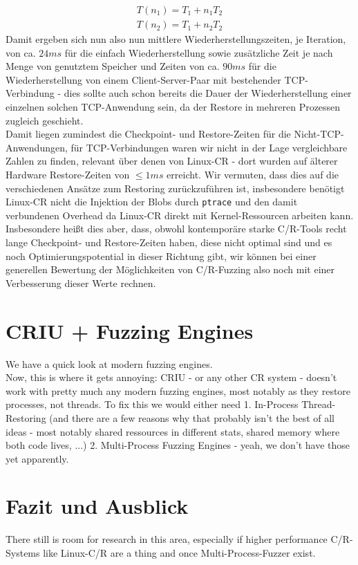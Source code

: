 \documentclass[a4paper]{article}
\begin{document}
\begin{equation}
    \begin{split}
    T(n_1) = T_1 + n_1 T_2 \\
    T(n_2) = T_1 + n_2 T_2
    \end{split}
\end{equation}
Damit ergeben sich nun also nun mittlere Wiederherstellungszeiten, je Iteration, von ca. $24ms$ für die einfach Wiederherstellung sowie zusätzliche Zeit je nach Menge von genutztem Speicher und Zeiten von ca. $90ms$ für die Wiederherstellung von einem Client-Server-Paar mit bestehender TCP-Verbindung - dies sollte auch schon bereits die Dauer der Wiederherstellung einer einzelnen solchen TCP-Anwendung sein, da der Restore in mehreren Prozessen zugleich geschieht.\\
Damit liegen zumindest die Checkpoint- und Restore-Zeiten für die Nicht-TCP-Anwendungen, für TCP-Verbindungen waren wir nicht in der Lage vergleichbare Zahlen zu finden, relevant über denen von Linux-CR - dort wurden auf älterer Hardware Restore-Zeiten von $\leq 1ms$ erreicht. Wir vermuten, dass dies auf die verschiedenen Ansätze zum Restoring zurückzuführen ist, insbesondere benötigt Linux-CR nicht die Injektion der Blobs durch \texttt{ptrace} und den damit verbundenen Overhead da Linux-CR direkt mit Kernel-Ressourcen arbeiten kann. Insbesondere heißt dies aber, dass, obwohl kontemporäre starke C/R-Tools recht lange Checkpoint- und Restore-Zeiten haben, diese nicht optimal sind und es noch Optimierungspotential in dieser Richtung gibt, wir können bei einer generellen Bewertung der Möglichkeiten von C/R-Fuzzing also noch mit einer Verbesserung dieser Werte rechnen.



\section{CRIU + Fuzzing Engines}
We have a quick look at modern fuzzing engines.\\
Now, this is where it gets annoying: CRIU - or any other CR system - doesn't work with pretty much any modern fuzzing engines, most notably as they restore processes, not threads. To fix this we would either need 1. In-Process Thread-Restoring (and there are a few reasons why that probably isn't the best of all ideas - most notably shared ressources in different stats, shared memory where both code lives, ...) 2. Multi-Process Fuzzing Engines - yeah, we don't have those yet apparently.

\section{Fazit und Ausblick}
There still is room for research in this area, especially if higher performance C/R-Systems like Linux-C/R are a thing and once Multi-Process-Fuzzer exist.
\end{document}

